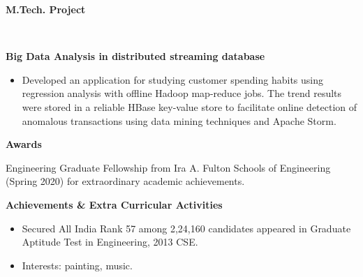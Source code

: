 \documentclass[a4paper,11pt]{article}
\newcommand{\lsep}{-0.5cm}
\newcommand{\resheading}[1]{{\small \colorbox{mygrey}{\begin{minipage}{0.975\textwidth}{\textbf{#1 \vphantom{p\^{E}}}}\end{minipage}}}}
\begin{document}
	\resheading{\textbf{\large M.Tech. Project} }\\[\lsep]
	\begin{description}
		\item \hspace{0.65 cm} \textbf{Big Data Analysis in distributed streaming database}
		\begin{itemize}
			\item Developed an application for studying customer spending habits using regression analysis with offline Hadoop map-reduce jobs. The trend results were stored in a reliable HBase key-value store to facilitate online detection of anomalous transactions using data mining techniques and Apache Storm. 
			
			
		\end{itemize}
		
	\end{description}
	
	
	\resheading{\textbf{\large Awards}}
	\begin{description}
		\item \hspace{0.65 cm} Engineering Graduate Fellowship from Ira A. Fulton Schools of Engineering (Spring 2020) for extraordinary academic achievements.
		
	\end{description}
	
	\resheading{\textbf{\large Achievements \& Extra Curricular Activities }}
	
	\begin{description}
		\item
		\begin{itemize}
			\item Secured All India Rank 57 among 2,24,160 candidates appeared in Graduate Aptitude Test in Engineering, 2013 CSE.
		\end{itemize}
		\item
		\begin{itemize}
			\item Interests: painting, music.
		\end{itemize}
	\end{description}
	
\end{document}

